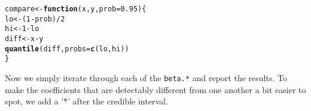 \documentclass[12pt]{article}\usepackage[]{graphicx}\usepackage[]{color}
\makeatletter
\newcommand{\hlnum}[1]{\textcolor[rgb]{0.686,0.059,0.569}{#1}}%
\newcommand{\hlopt}[1]{\textcolor[rgb]{0,0,0}{#1}}%
\newcommand{\hlstd}[1]{\textcolor[rgb]{0.345,0.345,0.345}{#1}}%
\newcommand{\hlkwa}[1]{\textcolor[rgb]{0.161,0.373,0.58}{\textbf{#1}}}%
\newcommand{\hlkwb}[1]{\textcolor[rgb]{0.69,0.353,0.396}{#1}}%
\newcommand{\hlkwc}[1]{\textcolor[rgb]{0.333,0.667,0.333}{#1}}%
\newcommand{\hlkwd}[1]{\textcolor[rgb]{0.737,0.353,0.396}{\textbf{#1}}}%
\newenvironment{kframe}{%
 \def\at@end@of@kframe{}%
 \ifinner\ifhmode%
  \def\at@end@of@kframe{\end{minipage}}%
  \begin{minipage}{\columnwidth}%
 \fi\fi%
 \def\FrameCommand##1{\hskip\@totalleftmargin \hskip-\fboxsep
 \colorbox{shadecolor}{##1}\hskip-\fboxsep
     \hskip-\linewidth \hskip-\@totalleftmargin \hskip\columnwidth}%
 \MakeFramed {\advance\hsize-\width
   \@totalleftmargin\z@ \linewidth\hsize
   \@setminipage}}%
 {\par\unskip\endMakeFramed%
 \at@end@of@kframe}
\newenvironment{knitrout}{}{} %
\makeatother
\begin{document}
\begin{knitrout}
\color{fgcolor}\begin{kframe}
\begin{alltt}
\hlstd{compare} \hlkwb{<-} \hlkwa{function}\hlstd{(}\hlkwc{x}\hlstd{,} \hlkwc{y}\hlstd{,} \hlkwc{prob} \hlstd{=} \hlnum{0.95}\hlstd{) \{}
  \hlstd{lo} \hlkwb{<-} \hlstd{(}\hlnum{1} \hlopt{-} \hlstd{prob)}\hlopt{/}\hlnum{2}
  \hlstd{hi} \hlkwb{<-} \hlnum{1} \hlopt{-} \hlstd{lo}
  \hlstd{diff} \hlkwb{<-} \hlstd{x} \hlopt{-} \hlstd{y}
  \hlkwd{quantile}\hlstd{(diff,} \hlkwc{probs} \hlstd{=} \hlkwd{c}\hlstd{(lo, hi))}
\hlstd{\}}
\end{alltt}
\end{kframe}
\end{knitrout}


Now we simply iterate through each of the {\tt beta.*} and report the
results. To make the coefficients that are detectably different from
one another a bit easier to spot, we add a '*' after the credible
interval.
\end{document}
